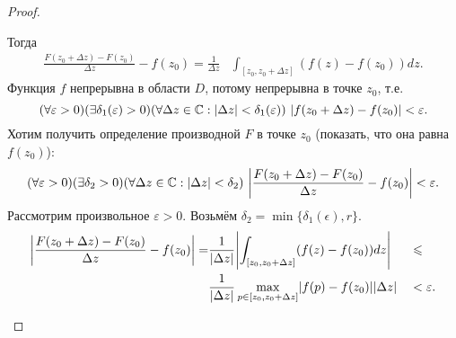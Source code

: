 \begin{proof}
\begin{enumerate}
		Тогда
		\[
			\begin{aligned}
				\frac{F(z_0 + \Delta z) - F(z_0)}{\Delta z} - f(z_0) = \frac{1}{\Delta z} & \int_{[z_0, z_0 + \Delta z]} (f(z) - f(z_0)) dz.
			\end{aligned}
		\]
		Функция $f$ непрерывна в области $D$, потому непрерывна в точке $z_0$, т.е.
		\[
			(\forall \varepsilon > 0) (\exists \delta_1(\varepsilon) > 0) \mathopen{}\left( \forall \Delta z \in \mathbb{C}: \mathopen{}\left\lvert\Delta z\right\rvert\mathclose{} < \delta_1(\varepsilon) \right)\mathclose{} \,\, \mathopen{}\left\lvert f(z_0 + \Delta z) - f(z_0)\right\rvert\mathclose{} < \varepsilon.
		\]
		Хотим получить определение производной $F$ в точке $z_0$ (показать, что она равна $f(z_0)$):
		\[
			(\forall \varepsilon > 0) (\exists \delta_2 > 0) \mathopen{}\left( \forall \Delta z \in \mathbb{C}: \mathopen{}\left\lvert\Delta z\right\rvert\mathclose{} < \delta_2 \right)\mathclose{} \,\, \mathopen{}\left\lvert\frac{F(z_0 + \Delta z) - F(z_0)}{\Delta z} - f(z_0)\right\rvert\mathclose{} < \varepsilon.
		\]
		Рассмотрим произвольное $\varepsilon > 0$. Возьмём $\delta_2 = \min \{ \delta_1(\epsilon), r \}$.
		\[
			\begin{aligned}
				\mathopen{}\left\lvert\frac{F(z_0 + \Delta z) - F(z_0)}{\Delta z} - f(z_0)\right\rvert\mathclose{} = & \frac{1}{\mathopen{}\left\lvert\Delta z\right\rvert\mathclose{}} \mathopen{}\left\lvert\int_{[z_0, z_0 + \Delta z]} (f(z) - f(z_0)) dz\right\rvert\mathclose{} && \leqslant \\
				& \frac{1}{\mathopen{}\left\lvert\Delta z\right\rvert\mathclose{}} \max_{p \in [z_0, z_0 + \Delta z]} \mathopen{}\left\lvert f(p) - f(z_0)\right\rvert\mathclose{} \mathopen{}\left\lvert\Delta z\right\rvert\mathclose{} && < \varepsilon.
			\end{aligned}
		\]
	\end{enumerate}
\end{proof}